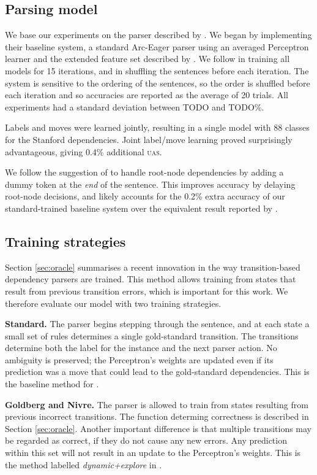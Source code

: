 \documentclass[11pt,letterpaper]{article}
\newcommand{\uas}{\textsc{uas}\xspace}
\begin{document}
\subsection{Parsing model}

We base our experiments on the parser described by \citet{goldberg:12}. We
began by implementing their baseline system, a standard Arc-Eager parser using
an averaged Perceptron learner and the extended feature set described by \citet{zhang:11}.
We follow \citeauthor{goldberg:12} in training all models for 15 iterations,
and in shuffling the sentences before each iteration.
The system is sensitive to the ordering of the sentences, so
the order is shuffled before each iteration and
so accuracies are reported as the average of 20 trials. All experiments had a
standard deviation between TODO and TODO\%.

Labels and moves were learned jointly, resulting in a single model with 88 classes
for the Stanford dependencies. Joint label/move learning proved surprisingly
advantageous, giving 0.4\% additional \uas.

We follow the suggestion of \citet{nivre:squib} to handle root-node dependencies by
adding a dummy token at the \emph{end} of the sentence.
This improves accuracy by delaying root-node decisions, and likely accounts for the
0.2\% extra accuracy of our standard-trained baseline system over the equivalent result
reported by \citet{goldberg:12}.

\subsection{Training strategies}

Section \ref{sec:oracle} summarises a recent innovation in the way transition-based
dependency parsers are trained. This method allows training from states that
result from previous transition errors, which is
important for this work. We therefore evaluate our model with two training strategies.

\textbf{Standard.} 
The parser begins stepping through the sentence, and at each state a small
set of rules determines a single gold-standard transition. The transitions
determine both the label for the instance and the next parser action. No ambiguity
is preserved; the Perceptron's weights are updated even if its prediction was a move
that could lead to the gold-standard dependencies.
This is the baseline method for \citet{goldberg:12}.

\textbf{Goldberg and Nivre.} The parser is allowed to train from states
resulting from previous incorrect transitions. The function determing correctness
is described in Section \ref{sec:oracle}. Another important difference is that
multiple transitions may be regarded as correct, if they do not cause any new
errors. Any prediction within this set will not result in an update to the
Perceptron's weights. This is the method labelled \emph{dynamic+explore}
in \citet{goldberg:12}.
\end{document}
